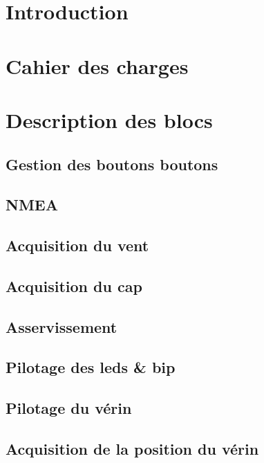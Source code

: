 \section{Introduction}

\section{Cahier des charges}

\section{Description des blocs}
\subsection{Gestion des boutons boutons}
\subsection{NMEA}
\subsection{Acquisition du vent}
\subsection{Acquisition du cap}
\subsection{Asservissement}
\subsection{Pilotage des leds \& bip}
\subsection{Pilotage du vérin}
\subsection{Acquisition de la position du vérin}